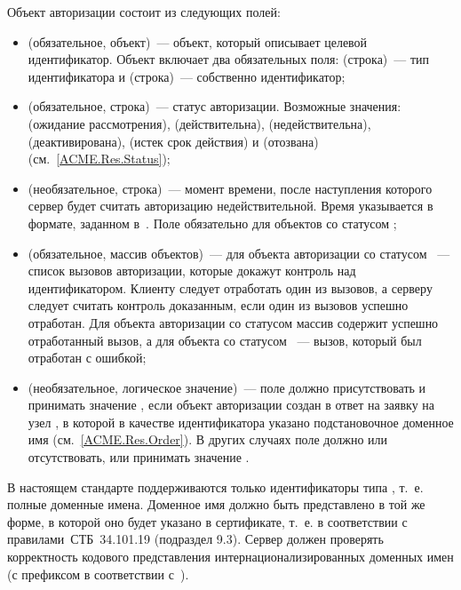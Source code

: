 Объект авторизации состоит из следующих полей:
%
\begin{itemize}
\item
{} (обязательное, объект)~--- объект, который описывает целевой 
идентификатор.
%
Объект включает два обязательных поля:  (строка)~---
тип идентификатора и  (строка)~--- собственно идентификатор;

\item
{} (обязательное, строка)~--- статус авторизации.
%
Возможные значения:  (ожидание рассмотрения), 
 (действительна),  (недействительна),
 (деактивирована),  (истек срок действия)
и  (отозвана) (см.~\ref{ACME.Res.Status});

\item
{} (необязательное, строка)~--- момент времени,
после наступления которого сервер будет считать авторизацию недействительной. 
%
Время указывается в формате, заданном в~\cite{RFC3339}. 
%
Поле обязательно для объектов со статусом ; 

\item
{} (обязательное, массив объектов)~--- для объекта авторизации 
со статусом ~--- список вызовов авторизации, которые докажут 
контроль над идентификатором.
%
Клиенту следует отработать один из вызовов, а серверу следует считать контроль 
доказанным, если один из вызовов успешно отработан.
%
Для объекта авторизации со статусом  массив  
содержит успешно отработанный вызов, а для объекта со статусом 
~--- вызов, который был отработан с ошибкой;

\item
{} (необязательное, логическое значение)~--- поле должно
присутствовать и принимать значение , если объект авторизации
создан в ответ на заявку на узел , в которой в качестве 
идентификатора указано подстановочное доменное имя (см.~\ref{ACME.Res.Order}).
%
В других случаях поле должно или отсутствовать, или принимать значение 
.
%
\end{itemize}

В настоящем стандарте поддерживаются только идентификаторы типа ,
т.~е. полные доменные имена. Доменное имя должно быть представлено в той же
форме, в которой оно будет указано в сертификате, т.~е. в соответствии с 
правилами~СТБ~34.101.19 (подраздел 9.3).
%
Сервер должен проверять корректность кодового представления 
интернационализированных доменных имен (с префиксом  в соответствии  
с~\cite{RFC5890}).

